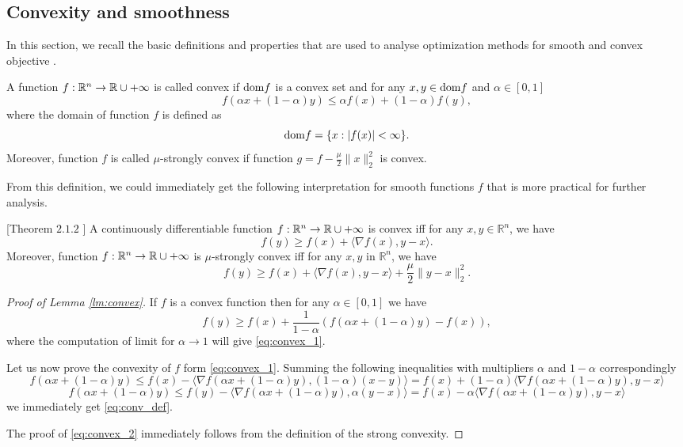 \subsection{Convexity and smoothness}\label{sec:basics_conv_and_smoothness}
In this section, we recall the basic definitions and properties that are used to analyse optimization methods for smooth and convex objective \cite{hiriart2012fundamentals}. 
\begin{definition}
A function $f:\mathbb{R}^n\rightarrow \mathbb{R}\cup{+\infty}$ is called convex if $\mathrm{dom} f$ is a convex set and for any $x, y\in \mathrm{dom} f$ and $\alpha \in[0,1]$
\begin{equation}\label{eq:conv_def}
f(\alpha x + (1-\alpha)y)\leq \alpha f(x) + (1-\alpha)f(y),
\end{equation}
where the domain of function $f$ is defined as
$$
\mathrm{dom} f = \{x:|f(x)|<\infty\}.
$$
Moreover, function $f$ is called $\mu$-strongly convex if function $g = f - \frac{\mu}{2}\|x\|_2^2$ is convex.
\end{definition}

From this definition, we could immediately get the following interpretation for smooth functions $f$ that is more practical for further analysis. 

\begin{lemma}\label{lm:convex}[Theorem $2.1.2$ \cite{nesterov-book}]
    A continuously differentiable function $f:\mathbb{R}^n\rightarrow \mathbb{R}\cup{+\infty}$ is convex iff for any $x,y\in\mathbb{R}^n$, we have
    \begin{equation}\label{eq:convex_1}
        f(y) \geq f(x) + \langle \nabla f(x), y-x\rangle.
    \end{equation}
    Moreover, function $f:\mathbb{R}^n\rightarrow \mathbb{R}\cup{+\infty}$ is $\mu$-strongly convex iff for any $x,y$ in $\mathbb{R}^n$, we have
    \begin{equation}\label{eq:convex_2}
        f(y) \geq f(x) + \langle \nabla f(x), y-x\rangle + \frac{\mu}{2}\|y-x\|_2^2.
    \end{equation}
\end{lemma}
\begin{proof}[Proof of Lemma \ref{lm:convex}]
If $f$ is a convex function then for any $\alpha\in[0,1]$ we have 
$$
f(y)\geq f(x) +\frac{1}{1-\alpha}\left(f(\alpha x + (1-\alpha)y) - f(x)\right),
$$
where the computation of limit for $\alpha \rightarrow 1$ will give \eqref{eq:convex_1}.

Let us now prove the convexity of $f$ form \eqref{eq:convex_1}.
Summing the following inequalities with multipliers $\alpha$ and $1-\alpha$ correspondingly
$$
f(\alpha x + (1-\alpha)y) \leq f(x) - \langle \nabla f(\alpha x + (1-\alpha)y), (1-\alpha)(x-y)\rangle = f(x) + (1-\alpha) \langle \nabla f(\alpha x + (1-\alpha)y), y-x\rangle
$$
$$
f(\alpha x + (1-\alpha)y) \leq f(y) - \langle \nabla f(\alpha x + (1-\alpha)y), \alpha(y-x)\rangle = f(x) - \alpha \langle \nabla f(\alpha x + (1-\alpha)y), y-x\rangle
$$
we immediately get \eqref{eq:conv_def}. 

The proof of \eqref{eq:convex_2} immediately follows from the definition of the strong convexity.
\end{proof}

